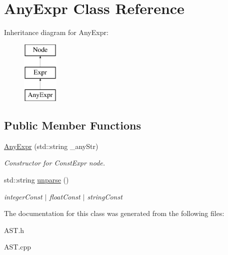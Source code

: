 \hypertarget{classAnyExpr}{\section{Any\-Expr Class Reference}
\label{classAnyExpr}
}
Inheritance diagram for Any\-Expr\-:\begin{figure}[H]
\begin{center}
\leavevmode
\includegraphics[height=3.000000cm]{classAnyExpr}
\end{center}
\end{figure}
\subsection*{Public Member Functions}
\begin{DoxyCompactItemize}
\item 
\hypertarget{classAnyExpr_a32bb417b464c1971ae3f8f07c9bb8e83}{\hyperlink{classAnyExpr_a32bb417b464c1971ae3f8f07c9bb8e83}{Any\-Expr} (std\-::string \-\_\-any\-Str)}\label{classAnyExpr_a32bb417b464c1971ae3f8f07c9bb8e83}

\begin{DoxyCompactList}\small\item\em Constructor for Const\-Expr node. \end{DoxyCompactList}\item 
\hypertarget{classAnyExpr_aa0dbd30150aca87996a4ed7ab18b3a8e}{std\-::string \hyperlink{classAnyExpr_aa0dbd30150aca87996a4ed7ab18b3a8e}{unparse} ()}\label{classAnyExpr_aa0dbd30150aca87996a4ed7ab18b3a8e}

\begin{DoxyCompactList}\small\item\em integer\-Const $\vert$ float\-Const $\vert$ string\-Const \end{DoxyCompactList}\end{DoxyCompactItemize}


The documentation for this class was generated from the following files\-:\begin{DoxyCompactItemize}
\item 
A\-S\-T.\-h\item 
A\-S\-T.\-cpp\end{DoxyCompactItemize}
